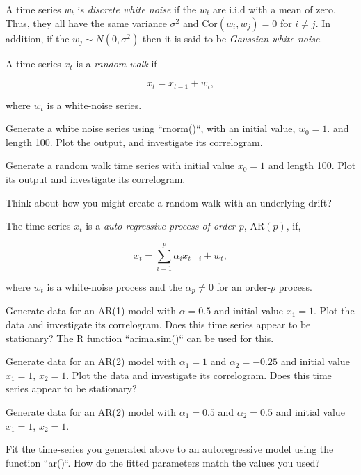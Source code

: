 \noindent
A time series $w_t$ is \emph{discrete white noise} if the $w_t$ are
i.i.d with a mean of zero. Thus, they all have the same variance
$\sigma^2$ and $\text{Cor}(w_i, w_j) = 0$ for $i \neq j$. In addition,
if the $w_j \sim N(0, \sigma^2)$ then it is said to be
\emph{Gaussian white noise}.

\vspace{5mm}

\noindent
A time series $x_t$ is a \emph{random walk} if

\begin{equation}
x_t = x_{t-1} + w_t,
\end{equation}

\noindent
where $w_t$ is a white-noise series.


Generate a white noise series using ``rnorm()``, with an initial
value, $w_0 = 1$. and length 100. Plot the output, and investigate its
correlogram.


Generate a random walk time series with initial value $x_0 = 1$ and
length 100. Plot its output and investigate its correlogram.


Think about how you might create a random walk with an underlying
drift?

\vspace{5mm}

\noindent
The time series $x_t$ is a \emph{auto-regressive process of order $p$},
$\text{AR}(p)$, if,

\begin{equation}
x_t = \sum^p_{i=1} \alpha_i x_{t-i} + w_t,
\end{equation}

\noindent
where $w_t$ is a white-noise process and the $\alpha_p \neq 0$ for an
order-$p$ process.


Generate data for an AR(1) model with $\alpha = 0.5$ and initial value
$x_1 = 1$. Plot the data and investigate its correlogram. Does this
time series appear to be stationary? The R function
``arima.sim()`` can be used for this.


Generate data for an AR(2) model with $\alpha_1 = 1$ and
$\alpha_2 = -0.25$ and initial value $x_1 = 1$, $x_2 = 1$. Plot the
data and investigate its correlogram. Does this time series appear to
be stationary?


Generate data for an AR(2) model with $\alpha_1 = 0.5$ and
$\alpha_2 = 0.5$ and initial value $x_1 = 1$, $x_2 = 1$.


Fit the time-series you generated above to an autoregressive model
using the function ``ar()``. How do the fitted parameters match
the values you used?

